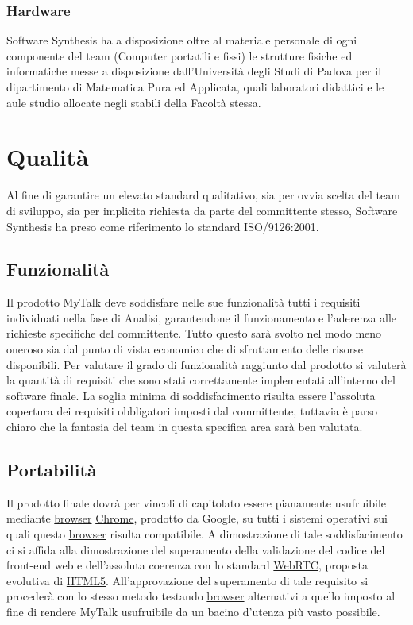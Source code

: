 \subsubsection{Hardware}
Software Synthesis ha a disposizione oltre al materiale personale di ogni componente del team (Computer portatili e fissi) le strutture fisiche ed informatiche messe a disposizione dall'Università degli Studi di Padova per il dipartimento di Matematica Pura ed Applicata, quali laboratori didattici e le aule studio allocate negli stabili della Facoltà stessa.

\clearpage
\section{Qualità}
Al fine di garantire un elevato standard qualitativo, sia per ovvia scelta del team di sviluppo, sia per implicita richiesta da parte del committente stesso, Software Synthesis ha preso come riferimento lo standard ISO/9126:2001.
 
\subsection{Funzionalità}
Il prodotto MyTalk deve soddisfare nelle sue funzionalità tutti i requisiti individuati nella fase di Analisi, garantendone il funzionamento e l'aderenza alle richieste specifiche del committente. Tutto questo sarà svolto nel modo meno oneroso sia dal punto di vista economico che di sfruttamento delle risorse disponibili.
Per valutare il grado di funzionalità raggiunto dal prodotto si valuterà la quantità di requisiti che sono stati correttamente implementati all'interno del software finale. La soglia minima di soddisfacimento risulta essere l'assoluta copertura dei requisiti obbligatori imposti dal committente, tuttavia è parso chiaro che la fantasia del team in questa specifica area sarà ben valutata.

\subsection{Portabilità}
Il prodotto finale dovrà per vincoli di capitolato essere pianamente usufruibile mediante \underline{browser} \underline{Chrome}, prodotto da Google, su tutti i sistemi operativi sui quali questo \underline{browser} risulta compatibile. 
A dimostrazione di tale soddisfacimento ci si affida alla dimostrazione del superamento della validazione del codice del front-end web e dell'assoluta coerenza con lo standard \underline{WebRTC}, proposta evolutiva di \underline{HTML5}.
All'approvazione del superamento di tale requisito si procederà con lo stesso metodo testando \underline{browser} alternativi a quello imposto al fine di rendere MyTalk usufruibile da un bacino d'utenza più vasto possibile.
